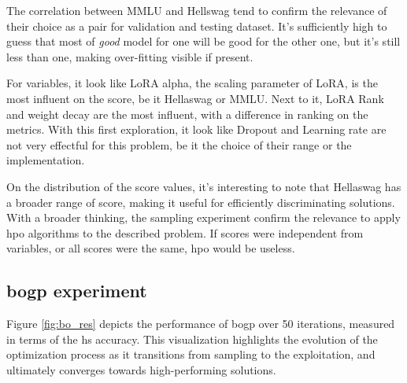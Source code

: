 The correlation between MMLU and Hellswag tend to confirm the relevance of their choice as a pair for validation and testing dataset. It's sufficiently high to guess that most of \textit{good} model for one will be good for the other one, but it's still less than one, making over-fitting visible if present.

For variables, it look like LoRA alpha, the scaling parameter of LoRA, is the most influent on the score, be it Hellaswag or MMLU. Next to it, LoRA Rank and weight decay are the most influent, with a difference in ranking on the metrics. With this first exploration, it look like Dropout and Learning rate are not very effectful for this problem, be it the choice of their range or the implementation. 

On the distribution of the score values, it's interesting to note that Hellaswag has a broader range of score, making it useful for efficiently discriminating solutions.  With a broader thinking, the sampling experiment confirm the relevance to apply \acrshort{hpo} algorithms to the described problem. If scores were independent from variables, or all scores were the same, \acrshort{hpo} would be useless. 

\subsection{\acrshort{bogp} experiment}
\label{sec:bo_exp}
Figure \ref{fig:bo_res} depicts the performance of \acrfull{bogp} over 50 iterations, measured in terms of the \Gls{hs} accuracy. This visualization highlights the evolution of the optimization process as it transitions from sampling to the exploitation, and ultimately converges towards high-performing solutions.



